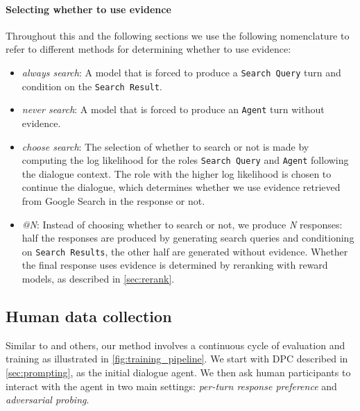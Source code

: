 \paragraph{Selecting whether to use evidence}\label{itm:choose-search}
Throughout this and the following sections we use the following nomenclature to refer to different methods for determining whether to use evidence:

\begin{itemize}
\item \emph{always search}: A model that is forced to produce a \texttt{Search Query} turn and condition on the \texttt{Search Result}.
\item \emph{never search}: A model that is forced to produce an \texttt{Agent} turn without evidence.
\item \emph{choose search}: The selection of whether to search or not is made by computing the log likelihood for the roles \texttt{Search Query} and \texttt{Agent} following the dialogue context. The role with the higher log likelihood is chosen to continue the dialogue, which determines whether we use evidence retrieved from Google Search in the response or not.
\item \emph{@N}: Instead of choosing whether to search or not, we produce \emph{N} responses: half the responses are produced by generating search queries and conditioning on \texttt{Search Results}, the other half are generated without evidence. Whether the final response uses evidence is determined by reranking with reward models, as described in \ref{sec:rerank}.

\end{itemize}

\subsection{Human data collection} \label{sec:eval_start}

Similar to \citet{ouyang2022instructgpt,stiennon2020learning} and others, our method involves a continuous cycle of evaluation and training as illustrated in \ref{fig:training_pipeline}. 
We start with DPC described in \ref{sec:prompting}, as the initial dialogue agent. We then ask human participants to interact with the agent in two main settings: \emph{per-turn response preference} and \emph{adversarial probing}.

